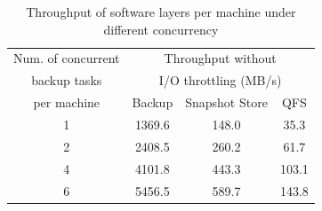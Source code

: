 \begin{table}[htbp]
\begin{small}
    \centering
    \begin{tabular}{|c|ccc|}
\hline
    Num. of concurrent      & \multicolumn{3}{c|}{Throughput without}    \\
    backup tasks            & \multicolumn{3}{c|}{I/O throttling (MB/s)} \\ \cline{2-4}
    per machine                & Backup                                     & Snapshot Store & QFS  \\ \hline
    1                       & 1369.6                                     & 148.0          & 35.3 \\
    2                       & 2408.5                                     & 260.2          & 61.7 \\
    4                       & 4101.8                                     & 443.3          & 103.1 \\
    6                       & 5456.5                                     & 589.7          & 143.8 \\ \hline
    \end{tabular}
\end{small}
\caption{Throughput of software layers per machine under different concurrency}
\label{tab:throughput}
\end{table}

